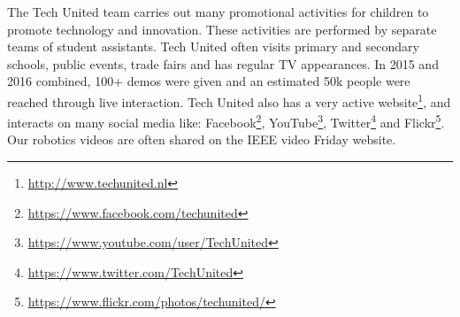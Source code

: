 The Tech United team carries out many promotional activities for children to promote technology and innovation. These activities are performed by separate teams of student assistants. Tech United often visits primary and secondary schools, public events, trade fairs and has regular TV appearances. In 2015 and 2016 combined, 100+ demos were given and an estimated 50k people were reached through live interaction.
Tech United also has a very active website\footnote{\url{http://www.techunited.nl}}, and interacts on many social media like: Facebook\footnote{\url{https://www.facebook.com/techunited}}, YouTube\footnote{\url{https://www.youtube.com/user/TechUnited}}, Twitter\footnote{\url{https://www.twitter.com/TechUnited}} and Flickr\footnote{\url{https://www.flickr.com/photos/techunited/}}. Our robotics videos are often shared on the IEEE video Friday website. 